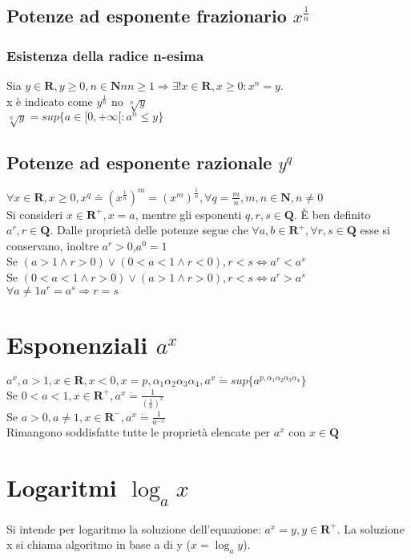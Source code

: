 \subsection{Potenze ad esponente frazionario $x^\frac{1}{n}$}
\subsubsection{Esistenza della radice n-esima}
Sia $y \in \mathbf{R}, y\ge 0, n \in \mathbf{N}n n\ge 1 \Rightarrow \exists ! x \in \mathbf{R}, x \ge 0: x^n=y$.\\
x \`e indicato come $y^\frac{1}{n}$ no $\sqrt[n]{y}$\\
$\sqrt[n]{y}=sup\{a \in [0, +\infty[:a^n\le y\}$
\subsection{Potenze ad esponente razionale $y^q$}
$\forall x \in \mathbf{R}, x\ge 0, x^q\doteq (x^\frac{1}{n})^m=(x^m)^\frac{1}{n}, \forall q=\frac{m}{n}, m,n \in \mathbf{N}, n\neq 0$
\\
Si consideri $x \in \mathbf{R^+}, x=a$, mentre gli esponenti $q, r, s \in \mathbf{Q}$. \`E ben definito $a^r, r\in \mathbf{Q}$. Dalle propriet\`a delle potenze segue che
$\forall a, b \in \mathbf{R^+}, \forall r,s \in \mathbf{Q}$ esse si conservano, inoltre $a^r>0$,$a^0=1$\\
Se $(a>1 \wedge r>0)\lor(0<a<1 \wedge r<0), r<s\Leftrightarrow a^r<a^s$\\
Se $(0<a<1 \wedge r>0)\lor(a>1 \wedge r>0), r<s\Leftrightarrow a^r>a^s$\\
$\forall a\neq 1 a^r=a^s\Rightarrow r=s$
\section{Esponenziali $a^x$}
$a^x, a>1, x \in \mathbf{R}, x<0, x=p,\alpha_1\alpha_2\alpha_3\alpha_4, a^x\dot{=}sup\{a^{p,\alpha_1\alpha_2\alpha_3\alpha_4}\}$\\
Se $0<a<1, x\in \mathbf{R^+}, a^x\dot{=}\frac{1}{(\frac{1}{a})^x}$\\
Se $a>0, a\neq 1, x \in \mathbf{R^-}, a^x\dot{=}\frac{1}{a^{-x}}$\\
Rimangono soddisfatte tutte le propriet\`a elencate per $a^x$ con $x\in\mathbf{Q}$
\section{Logaritmi $\log_a x$}
Si intende per logaritmo la soluzione dell'equazione: $a^x=y, y\in \mathbf{R^+}$. La soluzione x si chiama algoritmo in base a di y ($x=\log_a y$). 
